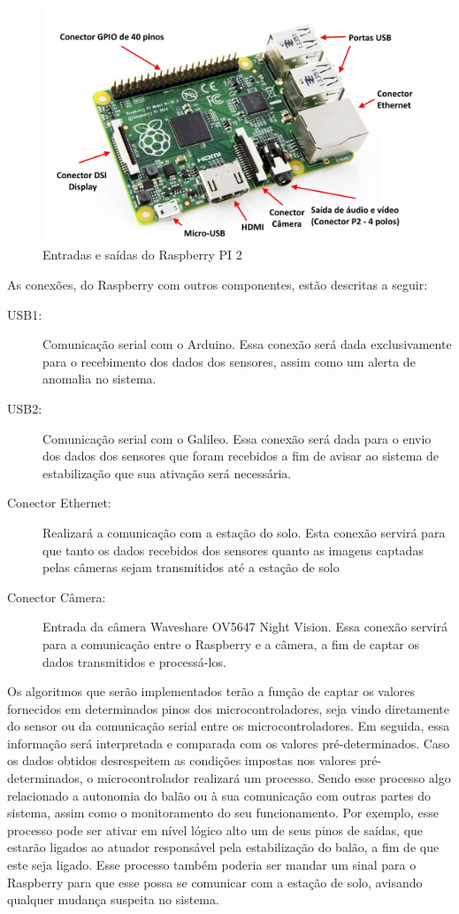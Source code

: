 		\begin{figure}[H]
			\centering
			\includegraphics[width=1\textwidth]{figuras/raspberryPi2}
			\caption[Entradas e saídas do Raspberry Pi 2]{Entradas e saídas do Raspberry PI 2~\cite{filipeflop}}
			\label{img:raspberryPi2}
		\end{figure}
		As conexões, do Raspberry com outros componentes, estão descritas a seguir:
		\begin{description}
			\item[USB1:] Comunicação serial com o Arduino. Essa conexão será dada exclusivamente para o recebimento dos dados dos sensores, assim como um alerta de anomalia no sistema.
			\item[USB2:] Comunicação serial com o Galileo. Essa conexão será dada para o envio dos dados dos sensores que foram recebidos a fim de avisar ao sistema de estabilização que sua ativação será necessária.
			\item[Conector Ethernet:] Realizará a comunicação com a estação do solo. Esta conexão servirá para que tanto os dados recebidos dos sensores quanto as imagens captadas pelas câmeras sejam transmitidos até a estação de solo
			\item[Conector Câmera:] Entrada da câmera Waveshare OV5647 Night Vision. Essa conexão servirá para a comunicação entre o Raspberry e a câmera, a fim de captar os dados transmitidos e processá-los.
		\end{description}

		Os algoritmos que serão implementados terão a função de captar os valores fornecidos em determinados pinos dos microcontroladores, seja vindo diretamente do sensor ou da comunicação serial entre os microcontroladores. Em seguida, essa informação será interpretada e comparada com os valores pré-determinados. Caso os dados obtidos desrespeitem as condições impostas nos valores pré-determinados, o microcontrolador realizará um processo. Sendo esse processo algo relacionado a autonomia do balão ou à sua comunicação com outras partes do sistema, assim como o monitoramento do seu funcionamento. Por exemplo, esse processo pode ser ativar em nível lógico alto um de seus pinos de saídas, que estarão ligados ao atuador responsável pela estabilização do balão, a fim de que este seja ligado. Esse processo também poderia ser mandar um sinal para o Raspberry para que esse possa se comunicar com a estação de solo, avisando qualquer mudança suspeita no sistema.

